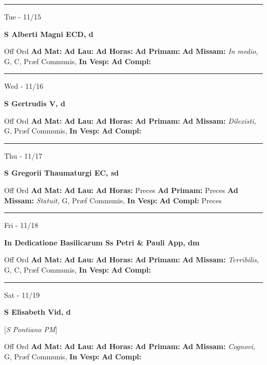 \documentclass[letterpaper, 10pt]{article}
\begin{document}
\hrule
\begin{center}
Tue - 11/15
\end{center}\textbf{ \large S Alberti Magni ECD, \textnormal{\normalsize d}}
\begin{justify}
Off Ord
\textbf{Ad Mat: }
\textbf{Ad Lau: }
\textbf{Ad Horas: }
\textbf{Ad Primam: }
\textbf{Ad Missam:} \textit{In medio, } G, C, Præf Communis, 
\textbf{In Vesp: }
\textbf{Ad Compl: }\end{justify}



\hrule
\begin{center}
Wed - 11/16
\end{center}\textbf{ \large S Gertrudis V, \textnormal{\normalsize d}}
\begin{justify}
Off Ord
\textbf{Ad Mat: }
\textbf{Ad Lau: }
\textbf{Ad Horas: }
\textbf{Ad Primam: }
\textbf{Ad Missam:} \textit{Dilexisti, } G, Præf Communis, 
\textbf{In Vesp: }
\textbf{Ad Compl: }\end{justify}



\hrule
\begin{center}
Thu - 11/17
\end{center}\textbf{ \large S Gregorii Thaumaturgi EC, \textnormal{\normalsize sd}}
\begin{justify}
Off Ord
\textbf{Ad Mat: }
\textbf{Ad Lau: }
\textbf{Ad Horas: }Preces
\textbf{Ad Primam: }Preces
\textbf{Ad Missam:} \textit{Statuit, } G, Præf Communis, 
\textbf{In Vesp: }
\textbf{Ad Compl: }Preces\end{justify}



\hrule
\begin{center}
Fri - 11/18
\end{center}\textbf{ \large In Dedicatione Basilicarum Ss Petri \& Pauli App, \textnormal{\normalsize dm}}
\begin{justify}
Off Ord
\textbf{Ad Mat: }
\textbf{Ad Lau: }
\textbf{Ad Horas: }
\textbf{Ad Primam: }
\textbf{Ad Missam:} \textit{Terribilis, } G, C, Præf Communis, 
\textbf{In Vesp: }
\textbf{Ad Compl: }\end{justify}



\hrule
\begin{center}
Sat - 11/19
\end{center}\textbf{ \large S Elisabeth Vid, \textnormal{\normalsize d}}

[\textit{S Pontiano PM}]
\begin{justify}
Off Ord
\textbf{Ad Mat: }
\textbf{Ad Lau: }
\textbf{Ad Horas: }
\textbf{Ad Primam: }
\textbf{Ad Missam:} \textit{Cognovi, } G, Præf Communis, 
\textbf{In Vesp: }
\textbf{Ad Compl: }\end{justify}
\end{document}
